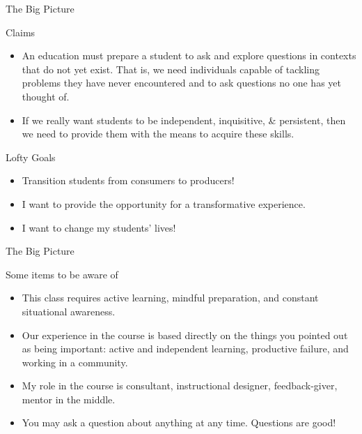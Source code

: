 \documentclass[10pt]{beamer}
\begin{document}
\begin{frame}{The Big Picture}

\vspace{2em}

\begin{block}{Claims}
\vspace{-.75em}
\begin{itemize}
\item An education must prepare a student to ask and explore questions in contexts that do not yet exist. That is, we need individuals capable of tackling problems they have never encountered and to ask questions no one has yet thought of.
\item If we really want students to be independent, inquisitive, \& persistent, then we need to provide them with the means to acquire these skills.
\end{itemize}
\end{block}

\begin{block}{Lofty Goals}
\vspace{-.75em}
\begin{itemize}
\item Transition students from consumers to producers!
\item I want to provide the opportunity for a transformative experience. 
\item I want to change my students' lives!
\end{itemize}
\end{block}

\end{frame}


\begin{frame}{The Big Picture}

\vspace{2em}

\begin{block}{Some items to be aware of}
\vspace{-.75em}
\begin{itemize}
\item This class requires \alert{active learning}, \alert{mindful preparation}, and \alert{constant situational awareness}. 
\item Our experience in the course is based directly on the things you pointed out as being important: \alert{active and independent learning}, \alert{productive failure}, and \alert{working in a community}.  
\item My role in the course is \alert{consultant}, \alert{instructional designer}, \alert{feedback-giver}, \alert{mentor in the middle}. 
\item You may ask a question about anything at any time. Questions are good!
\end{itemize}
\end{block}

\end{frame}

\end{document}
